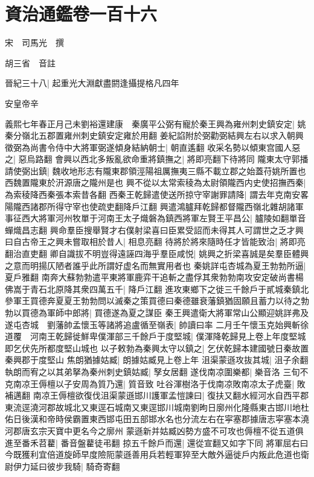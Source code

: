 \chapter{資治通鑑卷一百十六}


宋　司馬光　撰

胡三省　音註

晉紀三十八|{
	起重光大淵獻盡閼逢攝提格凡四年}


安皇帝辛

義熙七年春正月己未劉裕還建康　秦廣平公弼有寵於秦王興為雍州刺史鎮安定|{
	姚秦分嶺北五郡置雍州刺史鎮安定雍於用翻}
姜紀諂附於弼勸弼結興左右以求入朝興徵弼為尚書令侍中大將軍弼遂傾身結納朝士|{
	朝直遙翻}
收采名勢以傾東宫國人惡之|{
	惡烏路翻}
會興以西北多叛亂欲命重將鎮撫之|{
	將即亮翻下待將同}
隴東太守郭播請使弼出鎮|{
	魏收地形志有隴東郡領涇陽祖厲撫夷三縣不載立郡之始蓋苻姚所置也西魏置隴東於汧源唐之隴州是也}
興不從以太常索稜為太尉領隴西内史使招撫西秦|{
	為索稜降西秦張本索昔各翻}
西秦王乾歸遣使送所掠守宰謝罪請降|{
	謂去年克南安畧陽隴西諸郡所得守宰也使疏吏翻降戶江翻}
興遣鴻臚拜乾歸都督隴西嶺北雜胡諸軍事征西大將軍河州牧單于河南王太子熾磐為鎮西將軍左賢王平昌公|{
	臚陵如翻單音蟬熾昌志翻}
興命羣臣搜舉賢才右僕射梁喜曰臣累受詔而未得其人可謂世之乏才興曰自古帝王之興未嘗取相於昔人|{
	相息亮翻}
待將於將來隨時任才皆能致治|{
	將即亮翻治直吏翻}
卿自識拔不明豈得遠誣四海乎羣臣咸悦|{
	姚興之折梁喜誠是矣羣臣體興之意而明揚仄陋者誰乎此所謂好虚名而無實用者也}
秦姚詳屯杏城為夏王勃勃所逼|{
	夏戶雅翻}
南奔大蘇勃勃遣平東將軍鹿弈干追斬之盡俘其衆勃勃南攻安定破尚書楊佛嵩于青石北原降其衆四萬五千|{
	降戶江翻}
進攻東鄉下之徙三千餘戶于貳城秦鎮北參軍王買德奔夏夏王勃勃問以滅秦之策買德曰秦德雖衰藩鎮猶固願且蓄力以待之勃勃以買德為軍師中郎將|{
	買德遂為夏之謀臣}
秦王興遣衛大將軍常山公顯迎姚詳弗及遂屯杏城　劉藩帥孟懷玉等諸將追盧循至嶺表|{
	帥讀曰率}
二月壬午懷玉克始興斬徐道覆　河南王乾歸徙鮮卑僕渾部三千餘戶于度堅城|{
	僕渾降乾歸見上卷上年度堅城即乞伏先所都度堅山城也}
以子敕勃為秦興太守以鎮之|{
	乞伏乾歸本建國號日秦故置秦興郡于度堅山}
焦朗猶據姑臧|{
	朗據姑臧見上卷上年}
沮渠蒙遜攻抜其城|{
	沮子余翻}
執朗而宥之以其弟拏為秦州刺史鎮姑臧|{
	孥女居翻}
遂伐南凉圍樂都|{
	樂音洛}
三旬不克南凉王傉檀以子安周為質乃還|{
	質音致}
吐谷渾樹洛于伐南凉敗南凉太子虎臺|{
	敗補邁翻}
南凉王傉檀欲復伐沮渠蒙遜邯川護軍孟愷諫曰|{
	復扶又翻水經河水自西平郡東流逕澆河郡故城北又東逕石城南又東逕邯川城南劉昫日廓州化隆縣東古邯川地杜佑日後漢和帝時侯霸置東西邯屯田五部邯水名也分流左右在寜塞郡據唐志寜塞本澆河郡唐玄宗天寶中更名今之廓州}
蒙遜新并姑臧凶勢方盛不可攻也傉檀不從五道俱進至番禾苕藋|{
	番音盤藋徒弔翻}
掠五千餘戶而還|{
	還從宣翻又如字下同}
將軍屈右曰今既獲利宜倍道旋師早度險阨蒙遜善用兵若輕軍猝至大敵外逼徙戶内叛此危道也衛尉伊力延曰彼步我騎|{
	騎奇寄翻}
